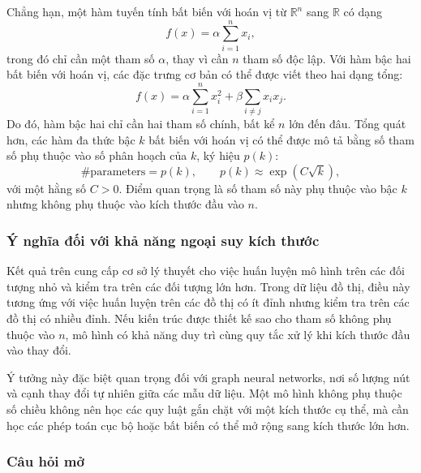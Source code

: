 Chẳng hạn, một hàm tuyến tính bất biến với hoán vị từ $\mathbb{R}^n$ sang $\mathbb{R}$ có dạng
\begin{equation}
    f(x)
    =
    \alpha \sum_{i=1}^{n} x_i,
    \label{eq:dimension-free-linear}
\end{equation}
trong đó chỉ cần một tham số $\alpha$, thay vì cần $n$ tham số độc lập. Với hàm bậc hai bất biến với hoán vị, các đặc trưng cơ bản có thể được viết theo hai dạng tổng:
\begin{equation}
    f(x)
    =
    \alpha \sum_{i=1}^{n} x_i^2
    +
    \beta \sum_{i \neq j} x_i x_j.
    \label{eq:dimension-free-quadratic}
\end{equation}
Do đó, hàm bậc hai chỉ cần hai tham số chính, bất kể $n$ lớn đến đâu. Tổng quát hơn, các hàm đa thức bậc $k$ bất biến với hoán vị có thể được mô tả bằng số tham số phụ thuộc vào số phân hoạch của $k$, ký hiệu $p(k)$:
\begin{equation}
    \#\mathrm{parameters}
    =
    p(k),
    \qquad
    p(k) \approx \exp(C\sqrt{k}),
    \label{eq:partition-parameter-count}
\end{equation}
với một hằng số $C > 0$. Điểm quan trọng là số tham số này phụ thuộc vào bậc $k$ nhưng không phụ thuộc vào kích thước đầu vào $n$.

\subsubsection{Ý nghĩa đối với khả năng ngoại suy kích thước}

Kết quả trên cung cấp cơ sở lý thuyết cho việc huấn luyện mô hình trên các đối tượng nhỏ và kiểm tra trên các đối tượng lớn hơn. Trong dữ liệu đồ thị, điều này tương ứng với việc huấn luyện trên các đồ thị có ít đỉnh nhưng kiểm tra trên các đồ thị có nhiều đỉnh. Nếu kiến trúc được thiết kế sao cho tham số không phụ thuộc vào $n$, mô hình có khả năng duy trì cùng quy tắc xử lý khi kích thước đầu vào thay đổi.

Ý tưởng này đặc biệt quan trọng đối với graph neural networks, nơi số lượng nút và cạnh thay đổi tự nhiên giữa các mẫu dữ liệu. Một mô hình không phụ thuộc số chiều không nên học các quy luật gắn chặt với một kích thước cụ thể, mà cần học các phép toán cục bộ hoặc bất biến có thể mở rộng sang kích thước lớn hơn.

\subsubsection{Câu hỏi mở}

